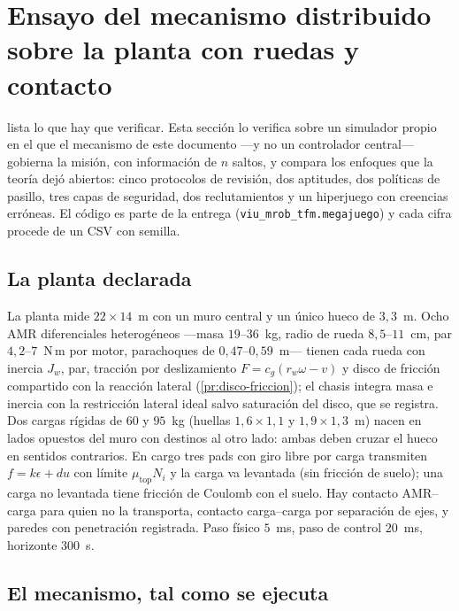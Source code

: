 \section{Ensayo del mecanismo distribuido sobre la planta con ruedas y contacto}
\label{sec:ensayo-cierre}

 lista lo que hay que verificar. Esta sección lo verifica
sobre un simulador propio en el que el mecanismo de este documento —y no un
controlador central— gobierna la misión, con información de $n$ saltos, y
compara los enfoques que la teoría dejó abiertos: cinco protocolos de
revisión, dos aptitudes, dos políticas de pasillo, tres capas de seguridad,
dos reclutamientos y un hiperjuego con creencias erróneas. El código es parte
de la entrega (\texttt{viu\_mrob\_tfm.megajuego}) y cada cifra procede de un
CSV con semilla.

\subsection{La planta declarada}

La planta mide $22\times14$~m con un muro central y un único hueco de
$3{,}3$~m. Ocho AMR diferenciales heterogéneos —masa
$19$--$36$~kg, radio de rueda $8{,}5$--$11$~cm, par $4{,}2$--$7$~N\,m por
motor, parachoques de $0{,}47$--$0{,}59$~m— tienen cada rueda con inercia
$J_w$, par, tracción por deslizamiento $F=c_g(r_w\omega-v)$ y disco de
fricción compartido con la reacción lateral (\cref{pr:disco-friccion}); el
chasis integra masa e inercia con la restricción lateral ideal salvo
saturación del disco, que se registra. Dos cargas rígidas de $60$ y $95$~kg
(huellas $1{,}6\times1{,}1$ y $1{,}9\times1{,}3$~m) nacen en lados opuestos
del muro con destinos al otro lado: ambas deben cruzar el hueco en sentidos
contrarios. En \textsf{cargo} tres pads con giro libre por carga transmiten
$f=k\epsilon+du$ con límite $\mu_{\mathrm{top}}N_i$ y la carga va levantada
(sin fricción de suelo); una carga no levantada tiene fricción de Coulomb con
el suelo. Hay contacto AMR--carga para quien no la transporta, contacto
carga--carga por separación de ejes, y paredes con penetración registrada.
Paso físico $5$~ms, paso de control $20$~ms, horizonte $300$~s.

\subsection{El mecanismo, tal como se ejecuta}

